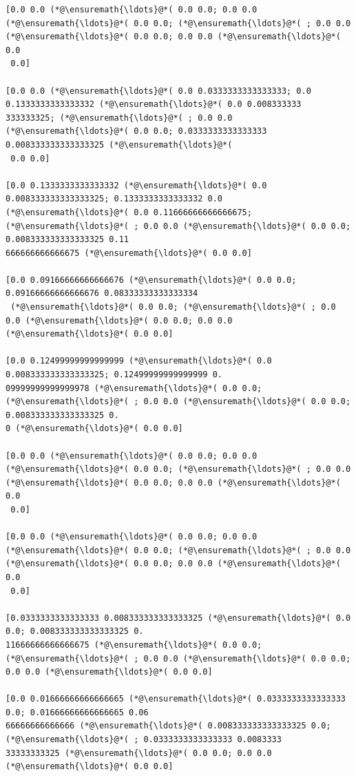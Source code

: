 \documentclass[12pt,a4paper]{article}
\begin{document}
\begin{lstlisting}
[0.0 0.0 (*@\ensuremath{\ldots}@*( 0.0 0.0; 0.0 0.0 (*@\ensuremath{\ldots}@*( 0.0 0.0; (*@\ensuremath{\ldots}@*( ; 0.0 0.0 (*@\ensuremath{\ldots}@*( 0.0 0.0; 0.0 0.0 (*@\ensuremath{\ldots}@*( 0.0
 0.0]

[0.0 0.0 (*@\ensuremath{\ldots}@*( 0.0 0.0333333333333333; 0.0 0.1333333333333332 (*@\ensuremath{\ldots}@*( 0.0 0.008333333
333333325; (*@\ensuremath{\ldots}@*( ; 0.0 0.0 (*@\ensuremath{\ldots}@*( 0.0 0.0; 0.0333333333333333 0.008333333333333325 (*@\ensuremath{\ldots}@*(
 0.0 0.0]

[0.0 0.1333333333333332 (*@\ensuremath{\ldots}@*( 0.0 0.008333333333333325; 0.1333333333333332 0.0 
(*@\ensuremath{\ldots}@*( 0.0 0.11666666666666675; (*@\ensuremath{\ldots}@*( ; 0.0 0.0 (*@\ensuremath{\ldots}@*( 0.0 0.0; 0.008333333333333325 0.11
666666666666675 (*@\ensuremath{\ldots}@*( 0.0 0.0]

[0.0 0.09166666666666676 (*@\ensuremath{\ldots}@*( 0.0 0.0; 0.09166666666666676 0.08333333333333334
 (*@\ensuremath{\ldots}@*( 0.0 0.0; (*@\ensuremath{\ldots}@*( ; 0.0 0.0 (*@\ensuremath{\ldots}@*( 0.0 0.0; 0.0 0.0 (*@\ensuremath{\ldots}@*( 0.0 0.0]

[0.0 0.12499999999999999 (*@\ensuremath{\ldots}@*( 0.0 0.008333333333333325; 0.12499999999999999 0.
09999999999999978 (*@\ensuremath{\ldots}@*( 0.0 0.0; (*@\ensuremath{\ldots}@*( ; 0.0 0.0 (*@\ensuremath{\ldots}@*( 0.0 0.0; 0.008333333333333325 0.
0 (*@\ensuremath{\ldots}@*( 0.0 0.0]

[0.0 0.0 (*@\ensuremath{\ldots}@*( 0.0 0.0; 0.0 0.0 (*@\ensuremath{\ldots}@*( 0.0 0.0; (*@\ensuremath{\ldots}@*( ; 0.0 0.0 (*@\ensuremath{\ldots}@*( 0.0 0.0; 0.0 0.0 (*@\ensuremath{\ldots}@*( 0.0
 0.0]

[0.0 0.0 (*@\ensuremath{\ldots}@*( 0.0 0.0; 0.0 0.0 (*@\ensuremath{\ldots}@*( 0.0 0.0; (*@\ensuremath{\ldots}@*( ; 0.0 0.0 (*@\ensuremath{\ldots}@*( 0.0 0.0; 0.0 0.0 (*@\ensuremath{\ldots}@*( 0.0
 0.0]

[0.0333333333333333 0.008333333333333325 (*@\ensuremath{\ldots}@*( 0.0 0.0; 0.008333333333333325 0.
11666666666666675 (*@\ensuremath{\ldots}@*( 0.0 0.0; (*@\ensuremath{\ldots}@*( ; 0.0 0.0 (*@\ensuremath{\ldots}@*( 0.0 0.0; 0.0 0.0 (*@\ensuremath{\ldots}@*( 0.0 0.0]

[0.0 0.01666666666666665 (*@\ensuremath{\ldots}@*( 0.0333333333333333 0.0; 0.01666666666666665 0.06
66666666666666 (*@\ensuremath{\ldots}@*( 0.008333333333333325 0.0; (*@\ensuremath{\ldots}@*( ; 0.0333333333333333 0.0083333
33333333325 (*@\ensuremath{\ldots}@*( 0.0 0.0; 0.0 0.0 (*@\ensuremath{\ldots}@*( 0.0 0.0]


\end{lstlisting}
\end{document}
